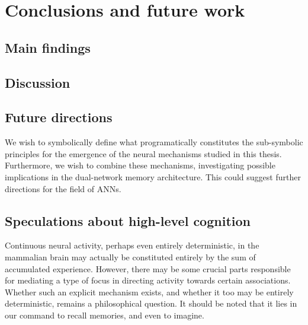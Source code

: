 
\chapter{Conclusions and future work}

\section{Main findings}



\section{Discussion}



\section{Future directions}

We wish to symbolically define what programatically constitutes the sub-symbolic principles for the emergence of the neural mechanisms studied in this thesis. Furthermore, we wish to combine these mechanisms, investigating possible implications in the dual-network memory architecture. This could suggest further directions for the field of ANNs.

\section{Speculations about high-level cognition}
Continuous neural activity, perhaps even entirely deterministic, in the mammalian brain may actually be constituted entirely by the sum of accumulated experience. However, there may be some crucial parts responsible for mediating a type of focus in directing activity towards certain associations. Whether such an explicit mechanism exists, and whether it too may be entirely deterministic, remains a philosophical question. It should be noted that it lies in our command to recall memories, and even to imagine.

\cleardoublepage
